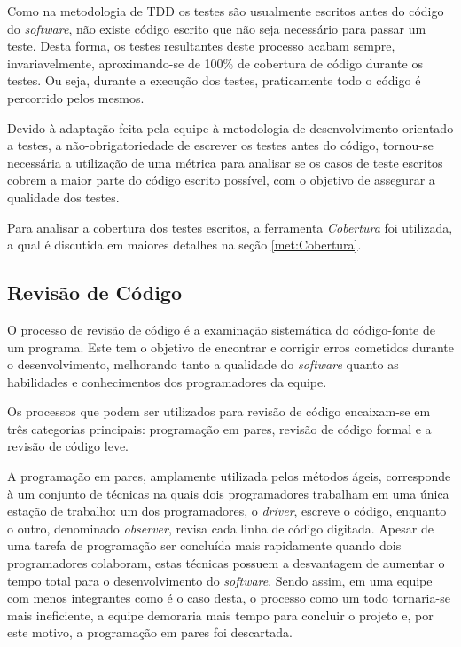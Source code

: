Como na metodologia de TDD os testes são usualmente escritos antes do código do \emph{software}, não existe código escrito que não seja necessário para passar um teste.
Desta forma, os testes resultantes deste processo acabam sempre, invariavelmente, aproximando-se de 100\% de cobertura de código durante os testes.
Ou seja, durante a execução dos testes, praticamente todo o código é percorrido pelos mesmos.

Devido à adaptação feita pela equipe à metodologia de desenvolvimento orientado a testes, a não-obrigatoriedade de escrever os testes antes do código, tornou-se necessária a utilização de uma métrica para analisar se os casos de teste escritos cobrem a maior parte do código escrito possível, com o objetivo de assegurar a qualidade dos testes.

Para analisar a cobertura dos testes escritos, a ferramenta \emph{Cobertura} foi utilizada, a qual é discutida em maiores detalhes na seção \ref{met:Cobertura}.


\subsection{Revisão de Código}


O processo de revisão de código é a examinação sistemática do código-fonte de um programa.
Este tem o objetivo de encontrar e corrigir erros cometidos durante o desenvolvimento, melhorando tanto a qualidade do \emph{software} quanto as habilidades e conhecimentos dos programadores da equipe.

Os processos que podem ser utilizados para revisão de código encaixam-se em três categorias principais: programação em pares, revisão de código formal e a revisão de código leve.

A programação em pares, amplamente utilizada pelos métodos ágeis, corresponde à um conjunto de técnicas na quais dois programadores trabalham em uma única estação de trabalho: um dos programadores, o \emph{driver}, escreve o código, enquanto o outro, denominado \emph{observer}, revisa cada linha de código digitada.
Apesar de uma tarefa de programação ser concluída mais rapidamente quando dois programadores colaboram, estas técnicas possuem a desvantagem de aumentar o tempo total para o desenvolvimento do \emph{software}. %
Sendo assim, em uma equipe com menos integrantes como é o caso desta, o processo como um todo tornaria-se mais ineficiente, a equipe demoraria mais tempo para concluir o projeto e, por este motivo, a programação em pares foi descartada.

